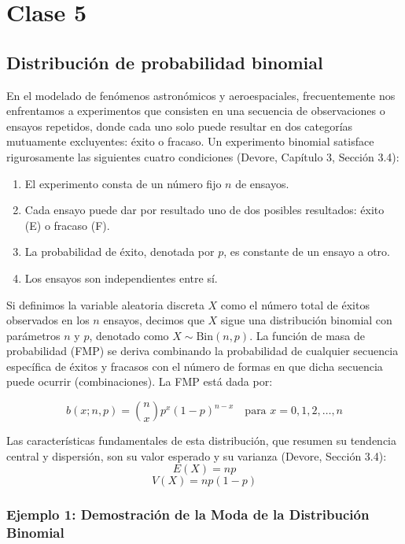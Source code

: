 \chapter{Clase 5}

\section{Distribución de probabilidad binomial}

En el modelado de fenómenos astronómicos y aeroespaciales, frecuentemente nos enfrentamos a experimentos que consisten en una secuencia de observaciones o ensayos repetidos, donde cada uno solo puede resultar en dos categorías mutuamente excluyentes: éxito o fracaso. Un experimento binomial satisface rigurosamente las siguientes cuatro condiciones (Devore, Capítulo 3, Sección 3.4):
\begin{enumerate}
    \item El experimento consta de un número fijo $n$ de ensayos.
    \item Cada ensayo puede dar por resultado uno de dos posibles resultados: éxito (E) o fracaso (F).
    \item La probabilidad de éxito, denotada por $p$, es constante de un ensayo a otro.
    \item Los ensayos son independientes entre sí.
\end{enumerate}

Si definimos la variable aleatoria discreta $X$ como el número total de éxitos observados en los $n$ ensayos, decimos que $X$ sigue una distribución binomial con parámetros $n$ y $p$, denotado como $X \sim \text{Bin}(n, p)$. La función de masa de probabilidad (FMP) se deriva combinando la probabilidad de cualquier secuencia específica de éxitos y fracasos con el número de formas en que dicha secuencia puede ocurrir (combinaciones). La FMP está dada por:

$$ b(x; n, p) = \binom{n}{x} p^x (1-p)^{n-x} \quad \text{para } x = 0, 1, 2, \dots, n $$

Las características fundamentales de esta distribución, que resumen su tendencia central y dispersión, son su valor esperado y su varianza (Devore, Sección 3.4):
$$ E(X) = np $$
$$ V(X) = np(1-p) $$

\subsection{Ejemplo 1: Demostración de la Moda de la Distribución Binomial}

